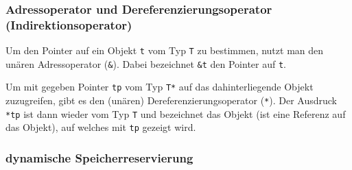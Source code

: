 \documentclass[a4paper]{report}
\begin{document}
\subsubsection{Adressoperator und Dereferenzierungsoperator (Indirektionsoperator)}
Um den Pointer auf ein Objekt \texttt{t} vom Typ \texttt{T} zu bestimmen, nutzt man den unären Adressoperator (\texttt{\&}). Dabei bezeichnet \texttt{\&t} den Pointer auf \texttt{t}.

Um mit gegeben Pointer \texttt{tp} vom Typ \texttt{T*} auf das dahinterliegende Objekt zuzugreifen, gibt es den (unären) Dereferenzierungsoperator (\texttt{*}). Der Ausdruck \texttt{*tp} ist dann wieder vom Typ \texttt{T} und bezeichnet das Objekt (ist eine Referenz auf das Objekt), auf welches mit \texttt{tp} gezeigt wird.

\subsubsection{dynamische Speicherreservierung}
\end{document}
